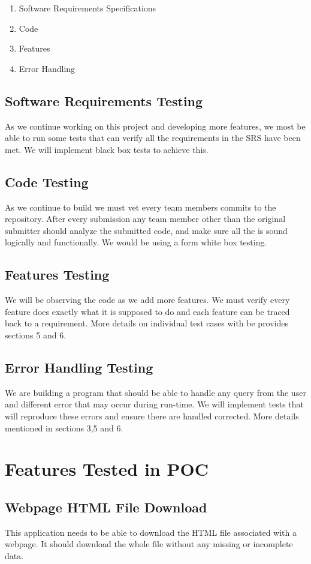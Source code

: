 \documentclass[12pt, titlepage]{article}
\begin{document}
\begin{enumerate}
  \item Software Requirements Specifications
  \item Code
  \item Features
  \item Error Handling
\end{enumerate}

\subsection{Software Requirements Testing}
As we continue working on this project and developing more features, we most be able to run some tests that can verify all the requirements in the SRS have been met. We will implement black box tests to achieve this.

\subsection{Code Testing}
As we continue to build we must vet every team members commits to the repository. After every submission any team member other than the original submitter should analyze the submitted code, and make sure all the is sound logically and functionally. We would be using a form white box testing.

\subsection{Features Testing}
We will be observing the code as we add more features. We must verify every feature does exactly what it is supposed to do and each feature can be traced back to a requirement. More details on individual test cases with be provides sections 5 and 6.

\subsection{Error Handling Testing}
We are building a program that should be able to handle any query from the user and different error that may occur during run-time. We will implement tests that will reproduce these errors and ensure there are handled corrected. More details mentioned in sections 3,5 and 6.


\section{Features Tested in POC}
\subsection{Webpage HTML File Download}
This application needs to be able to download the HTML file associated with a webpage. It should download the whole file without any missing or incomplete data.\\
\end{document}
